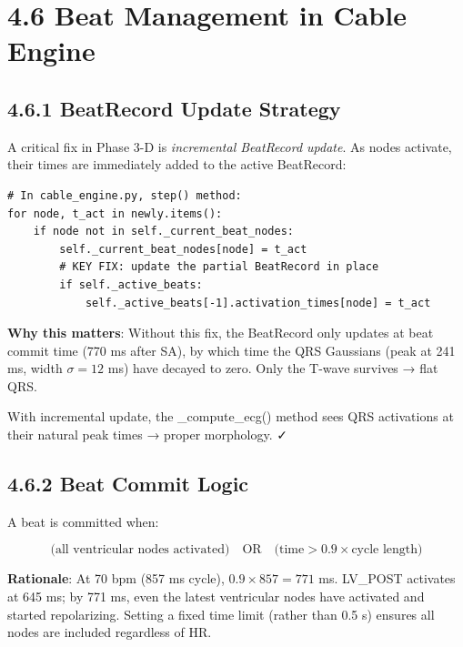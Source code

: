 \section{4.6 Beat Management in Cable Engine}

\subsection{4.6.1 BeatRecord Update Strategy}

A critical fix in Phase 3-D is \emph{incremental BeatRecord update}. As nodes activate, their times are immediately added to the active BeatRecord:

\begin{lstlisting}
# In cable_engine.py, step() method:
for node, t_act in newly.items():
    if node not in self._current_beat_nodes:
        self._current_beat_nodes[node] = t_act
        # KEY FIX: update the partial BeatRecord in place
        if self._active_beats:
            self._active_beats[-1].activation_times[node] = t_act
\end{lstlisting}

\textbf{Why this matters}: Without this fix, the BeatRecord only updates at beat commit time (770 ms after SA), by which time the QRS Gaussians (peak at 241 ms, width $\sigma = 12$ ms) have decayed to zero. Only the T-wave survives → flat QRS.

With incremental update, the _compute_ecg() method sees QRS activations at their natural peak times → proper morphology. ✓

\subsection{4.6.2 Beat Commit Logic}

A beat is committed when:

\begin{equation}
\text{(all ventricular nodes activated)} \quad \text{OR} \quad \text{(time} > 0.9 \times \text{cycle length)}
\end{equation}

\textbf{Rationale}: At 70 bpm (857 ms cycle), $0.9 \times 857 = 771$ ms. LV\_POST activates at 645 ms; by 771 ms, even the latest ventricular nodes have activated and started repolarizing. Setting a fixed time limit (rather than 0.5 s) ensures all nodes are included regardless of HR.


